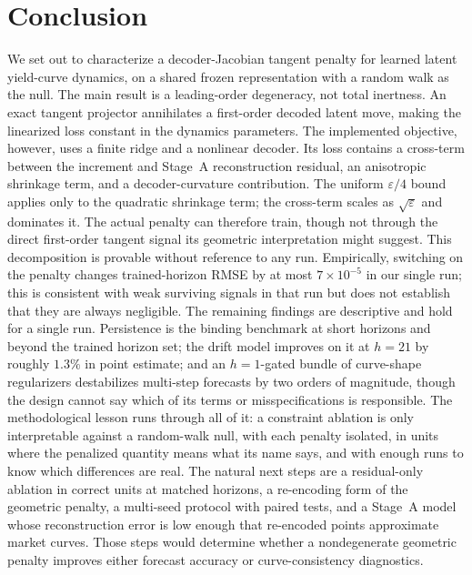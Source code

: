 \documentclass{article} %
\begin{document}
\section{Conclusion}
\label{sec:conclusion}
We set out to characterize a decoder-Jacobian tangent penalty for learned latent
yield-curve dynamics, on a shared frozen representation with a random walk as the
null. The main result is a leading-order degeneracy, not total inertness.
An exact tangent projector annihilates a first-order decoded latent move, making the
linearized loss constant in the dynamics parameters. The implemented objective,
however, uses a finite ridge and a nonlinear decoder. Its loss contains a cross-term
between the increment and Stage~A reconstruction residual, an anisotropic shrinkage
term, and a decoder-curvature contribution. The uniform $\varepsilon/4$ bound applies
only to the quadratic shrinkage term; the cross-term scales as $\sqrt{\varepsilon}$
and dominates it. The actual penalty can therefore train, though
not through the direct first-order tangent signal its geometric interpretation might
suggest. This decomposition is provable without reference to any run. Empirically,
switching on the penalty changes trained-horizon RMSE by at most
$7\times10^{-5}$ in our single run; this is consistent with weak surviving signals
in that run but does not establish that they are always negligible.
The remaining findings are descriptive and hold for a single run. Persistence is the
binding benchmark at short horizons and beyond the trained horizon set; the drift
model improves on it at $h{=}21$ by roughly $1.3\%$ in point estimate; and an
$h{=}1$-gated bundle of curve-shape regularizers destabilizes multi-step forecasts by
two orders of magnitude, though the design cannot say which of its terms or
misspecifications is responsible.
The methodological lesson runs through all of it: a constraint ablation is only
interpretable against a random-walk null, with each penalty isolated, in units where
the penalized quantity means what its name says, and with enough runs to know which
differences are real. The natural next steps are a residual-only ablation in correct
units at matched horizons, a re-encoding form of the geometric penalty, a multi-seed
protocol with paired tests, and a Stage~A model whose reconstruction error is low
enough that re-encoded points approximate market curves. Those steps would determine
whether a nondegenerate geometric penalty improves either forecast accuracy or
curve-consistency diagnostics.
\label{last_page}


\end{document}
